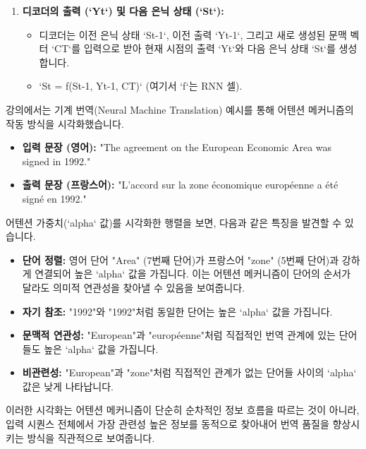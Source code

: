 \documentclass[11pt,a4paper]{article}
\begin{document}
\begin{enumerate}
\begin{itemize}
        \item `CT = sum_{j=1}^{T} (alpha_{tj} * Hj)`
        \item `CT`는 현재 시점 `t`의 출력을 생성하는 데 필요한 가장 관련성 높은 정보를 압축한 동적인 표현입니다.
    \end{itemize}
    \item \textbf{디코더의 출력 (`Yt`) 및 다음 은닉 상태 (`St`):}
    \begin{itemize}
        \item 디코더는 이전 은닉 상태 `St-1`, 이전 출력 `Yt-1`, 그리고 새로 생성된 문맥 벡터 `CT`를 입력으로 받아 현재 시점의 출력 `Yt`와 다음 은닉 상태 `St`를 생성합니다.
        \item `St = f(St-1, Yt-1, CT)` (여기서 `f`는 RNN 셀).
    \end{itemize}
\end{enumerate}

\begin{examplebox}[title={예시: 기계 번역에서의 어텐션 시각화}]
강의에서는 기계 번역(Neural Machine Translation) 예시를 통해 어텐션 메커니즘의 작동 방식을 시각화했습니다.

\begin{itemize}
    \item \textbf{입력 문장 (영어):} "The agreement on the European Economic Area was signed in 1992."
    \item \textbf{출력 문장 (프랑스어):} "L'accord sur la zone économique européenne a été signé en 1992."
\end{itemize}

어텐션 가중치(`alpha` 값)를 시각화한 행렬을 보면, 다음과 같은 특징을 발견할 수 있습니다.
\begin{itemize}
    \item \textbf{단어 정렬:} 영어 단어 "Area" (7번째 단어)가 프랑스어 "zone" (5번째 단어)과 강하게 연결되어 높은 `alpha` 값을 가집니다. 이는 어텐션 메커니즘이 단어의 순서가 달라도 의미적 연관성을 찾아낼 수 있음을 보여줍니다.
    \item \textbf{자기 참조:} "1992"와 "1992"처럼 동일한 단어는 높은 `alpha` 값을 가집니다.
    \item \textbf{문맥적 연관성:} "European"과 "européenne"처럼 직접적인 번역 관계에 있는 단어들도 높은 `alpha` 값을 가집니다.
    \item \textbf{비관련성:} "European"과 "zone"처럼 직접적인 관계가 없는 단어들 사이의 `alpha` 값은 낮게 나타납니다.
\end{itemize}
이러한 시각화는 어텐션 메커니즘이 단순히 순차적인 정보 흐름을 따르는 것이 아니라, 입력 시퀀스 전체에서 가장 관련성 높은 정보를 동적으로 찾아내어 번역 품질을 향상시키는 방식을 직관적으로 보여줍니다.
\end{examplebox}
\end{document}
